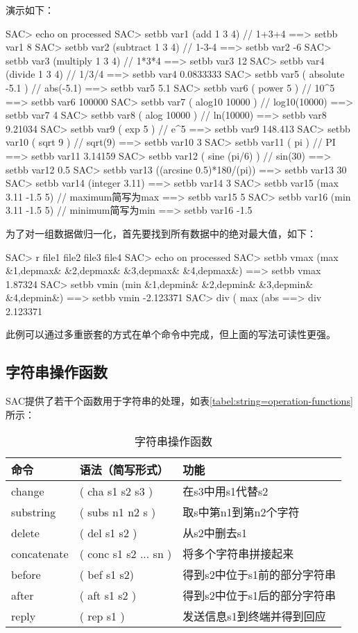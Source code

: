 演示如下：
\begin{SACCode}
SAC> echo on processed
SAC> setbb var1 (add 1 3 4)         // 1+3+4
 ==>  setbb var1 8
SAC> setbb var2 (subtract 1 3 4)    // 1-3-4
 ==>  setbb var2 -6
SAC> setbb var3 (multiply 1 3 4)    // 1*3*4
 ==>  setbb var3 12
SAC> setbb var4 (divide 1 3 4)      // 1/3/4
 ==>  setbb var4 0.0833333
SAC> setbb var5 ( absolute -5.1 )   // abs(-5.1)
 ==>  setbb var5 5.1
SAC> setbb var6 ( power 5 )         // 10^5
 ==>  setbb var6 100000
SAC> setbb var7 ( alog10 10000 )    // log10(10000)
 ==>  setbb var7 4
SAC> setbb var8 ( alog 10000 )      // ln(10000)
 ==>  setbb var8 9.21034
SAC> setbb var9 ( exp 5 )           // e^5
 ==>  setbb var9 148.413
SAC> setbb var10 ( sqrt 9 )         // sqrt(9)
 ==>  setbb var10 3
SAC> setbb var11 ( pi )             // PI
 ==>  setbb var11 3.14159
 SAC> setbb var12 ( sine (pi/6) )   // sin(30)
 ==>  setbb var12 0.5
SAC> setbb var13 ((arcsine 0.5)*180/(pi))
 ==>  setbb var13 30
SAC> setbb var14 (integer 3.11)
 ==>  setbb var14 3
SAC> setbb var15 (max 3.11 -1.5 5)  // maximum简写为max
 ==>  setbb var15 5
SAC> setbb var16 (min 3.11 -1.5 5)  // minimum简写为min
 ==>  setbb var16 -1.5
\end{SACCode}

为了对一组数据做归一化，首先要找到所有数据中的绝对最大值，如下：
\begin{SACCode}
SAC> r file1 file2 file3 file4
SAC> echo on processed
SAC> setbb vmax (max &1,depmax& &2,depmax& &3,depmax& &4,depmax&)
 ==> setbb vmax 1.87324
SAC> setbb vmin (min &1,depmin& &2,depmin& &3,depmin& &4,depmin&)
 ==> setbb vmin -2.123371
SAC> div ( max (abs %
 ==>  div 2.123371 
\end{SACCode}
此例可以通过多重嵌套的方式在单个命令中完成，但上面的写法可读性更强。

\subsection{字符串操作函数}
SAC提供了若干个函数用于字符串的处理，如表\ref{tabel:string=operation-functions}所示：

\begin{table}[H]
\centering
\caption{字符串操作函数}
\label{table:string-operation-functions}
\begin{tabular}{lll}
	\toprule
	命令	&	语法（简写形式）	&	功能	\\
	\midrule
	change		&	( cha s1 s2 s3 ) 	&	在s3中用s1代替s2	\\
	substring 	&	( subs n1 n2 s ) 	&	取s中第n1到第n2个字符\\
	delete		&	( del s1 s2 )		&	从s2中删去s1	\\
	concatenate &	( conc s1 s2 ... sn )	&	将多个字符串拼接起来 \\
	before		&	( bef s1 s2)			&	得到s2中位于s1前的部分字符串\\
	after		&	( aft s1 s2 )			&	得到s2中位于s1后的部分字符串\\
	reply		&	( rep s1 )			&	发送信息s1到终端并得到回应	\\
	\bottomrule
\end{tabular}
\end{table}

